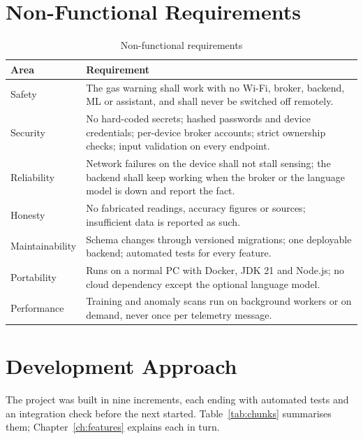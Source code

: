 \documentclass[12pt,a4paper,oneside]{report}
\begin{document}
\section{Non-Functional Requirements}
\begin{table}[H]
\centering
\caption{Non-functional requirements}
\label{tab:nonfunc-req}
\begin{tabularx}{\textwidth}{lX}
\toprule
\textbf{Area} & \textbf{Requirement}\\
\midrule
Safety & The gas warning shall work with no Wi-Fi, broker, backend, ML or assistant, and shall never be switched off remotely.\\
Security & No hard-coded secrets; hashed passwords and device credentials; per-device broker accounts; strict ownership checks; input validation on every endpoint.\\
Reliability & Network failures on the device shall not stall sensing; the backend shall keep working when the broker or the language model is down and report the fact.\\
Honesty & No fabricated readings, accuracy figures or sources; insufficient data is reported as such.\\
Maintainability & Schema changes through versioned migrations; one deployable backend; automated tests for every feature.\\
Portability & Runs on a normal PC with Docker, JDK 21 and Node.js; no cloud dependency except the optional language model.\\
Performance & Training and anomaly scans run on background workers or on demand, never once per telemetry message.\\
\bottomrule
\end{tabularx}
\end{table}

\section{Development Approach}
\label{sec:chunks}
The project was built in nine increments, each ending with automated tests and an integration check before the next started. Table~\ref{tab:chunks} summarises them; Chapter~\ref{ch:features} explains each in turn.
\end{document}
